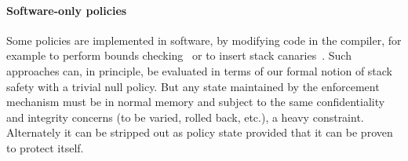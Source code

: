 \documentclass[acmsmall,review,anonymous]{acmart}\settopmatter{printfolios=true,printccs=false,printacmref=false}
\begin{document}

\paragraph*{Software-only policies}
%
Some policies are implemented in software, by modifying code in the
compiler, for example to perform bounds checking~\citep{NagarakatteZMZ09} or
to insert stack canaries~\citep{Cowan+98}. Such approaches can, in principle,
be evaluated in terms of our formal notion of stack safety with a trivial null
policy. But any state maintained by the enforcement mechanism must be in normal
memory and subject to the same confidentiality and integrity concerns (to be
varied, rolled back, etc.), a heavy constraint. Alternately it can be stripped
out as policy state provided that it can be proven to protect itself.

\ifaftersubmission{}\fi


\end{document}
